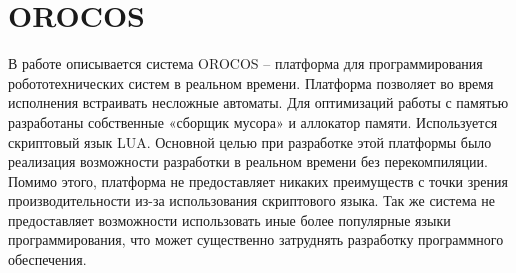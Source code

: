 \section{OROCOS}

В работе \cite{klotzbucher2010orocos}  описывается система OROCOS – платформа 
для программирования робототехнических систем в реальном времени. Платформа 
позволяет во время исполнения встраивать несложные автоматы. Для оптимизаций 
работы с памятью разработаны собственные «сборщик мусора» и аллокатор памяти. 
Используется скриптовый язык LUA. Основной целью при разработке этой платформы 
было реализация возможности разработки в реальном времени без перекомпиляции. 
Помимо этого, платформа не предоставляет никаких преимуществ с точки зрения 
производительности из-за использования скриптового языка. Так же система не 
предоставляет возможности использовать иные более популярные языки 
программирования, что может существенно затруднять разработку программного 
обеспечения.